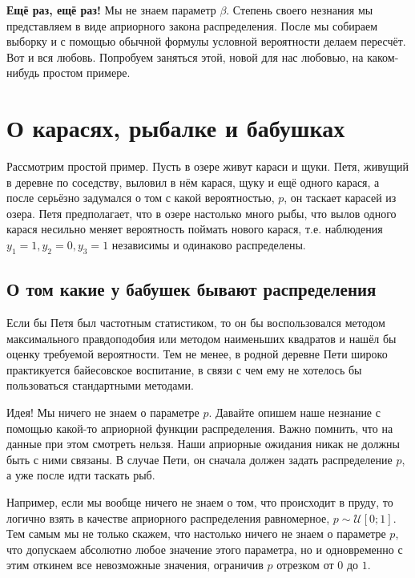 \documentclass[12pt, a4paper, oneside]{extreport}
\def \mU{\mathcal{U}}
\theoremstyle{plain}              %
\theoremstyle{definition}         %
\begin{document}
\textbf{Ещё раз, ещё раз!} Мы не знаем параметр $\beta$. Степень своего незнания мы представляем в виде априорного закона распределения. После мы собираем выборку и с помощью обычной формулы условной вероятности делаем пересчёт. Вот и вся любовь. Попробуем заняться этой, новой для нас любовью, на каком-нибудь простом примере.

\section{О карасях, рыбалке и бабушках}

Рассмотрим простой пример. Пусть в озере живут караси и щуки. Петя, живущий в деревне по соседству, выловил в нём карася, щуку и ещё одного карася, а после серьёзно задумался о том с какой вероятностью, $p$, он таскает карасей из озера. Петя предполагает, что в озере настолько много рыбы, что вылов одного карася несильно меняет вероятность поймать нового карася, т.е. наблюдения $y_1 = 1, y_2 = 0, y_3 = 1$ независимы и одинаково распределены.

\subsection*{О том какие у бабушек бывают распределения}

Если бы Петя был частотным статистиком, то он бы воспользовался методом максимального правдоподобия или методом наименьших квадратов и нашёл бы оценку требуемой вероятности. Тем не менее, в родной деревне Пети широко практикуется байесовское воспитание, в связи с чем ему не хотелось бы пользоваться стандартными методами.

Идея! Мы ничего не знаем о параметре $p$. Давайте опишем наше незнание с помощью какой-то априорной функции распределения. Важно  помнить, что на данные при этом смотреть нельзя. Наши априорные ожидания никак не должны быть с ними связаны. В случае Пети, он сначала должен задать распределение $p$, а уже после идти таскать рыб. 

Например, если мы вообще ничего не знаем о том, что происходит в пруду, то логично взять в качестве априорного распределения равномерное, $p \sim \mU[0;1]$. Тем самым мы не только скажем, что настолько ничего не знаем о параметре $p$, что допускаем абсолютно любое значение этого параметра, но и одновременно с этим откинем все невозможные значения, ограничив $p$ отрезком от $0$ до $1$.
\end{document}
